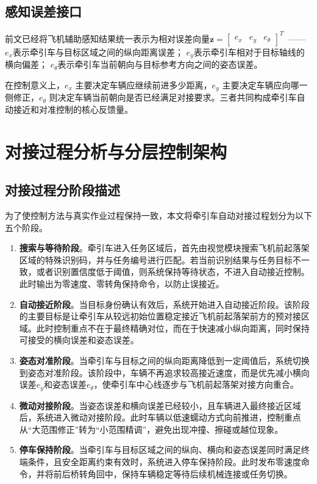 \subsection{感知误差接口}

前文已经将飞机辅助感知结果统一表示为相对误差向量\(\mathbf{z} = \begin{bmatrix}
e_{x} & e_{y} & e_{\theta}
\end{bmatrix}^{T}\)
\(\ \)------\(e_{x}\)表示牵引车与目标区域之间的纵向距离误差；
\(e_{y}\)表示牵引车相对于目标轴线的横向偏差；
\(e_{\theta}\)表示牵引车当前朝向与目标参考方向之间的姿态误差。

在控制意义上，\(e_{x}\) 主要决定车辆应继续前进多少距离，\(e_{y}\)
主要决定车辆应向哪一侧修正，\(e_{\theta}\)
则决定车辆当前朝向是否已经满足对接要求。三者共同构成牵引车自动接近和对准控制的核心反馈量。

\section{对接过程分析与分层控制架构}

\subsection{对接过程分阶段描述}

为了使控制方法与真实作业过程保持一致，本文将牵引车自动对接过程划分为以下五个阶段。
\begin{enumerate}[label=（\arabic*）,leftmargin=4em]
\item \textbf{搜索与等待阶段}。牵引车进入任务区域后，首先由视觉模块搜索飞机前起落架区域的特殊识别码，并与任务编号进行匹配。若当前识别结果与任务目标不一致，或者识别置信度低于阈值，则系统保持等待状态，不进入自动接近控制。此时输出为零速度、零转角保持命令，以防止误接近。
\item \textbf{自动接近阶段}。当目标身份确认有效后，系统开始进入自动接近阶段。该阶段的主要目标是让牵引车从较远初始位置稳定接近飞机前起落架前方的预对接区域。此时控制重点不在于最终精确对位，而在于快速减小纵向距离，同时保持可接受的横向误差和姿态误差。
\item \textbf{姿态对准阶段}。当牵引车与目标之间的纵向距离降低到一定阈值后，系统切换到姿态对准阶段。该阶段中，车辆不再追求较高接近速度，而是优先减小横向误差\(e_y\)和姿态误差\(e_\theta\)，使牵引车中心线逐步与飞机前起落架对接方向重合。
\item \textbf{微动对接阶段}。当姿态误差和横向误差已经较小，且车辆进入最终接近区域后，系统进入微动对接阶段。此时车辆以低速蠕动方式向前推进，控制重点从``大范围修正''转为``小范围精调''，避免出现冲撞、擦碰或越位现象。
\item \textbf{停车保持阶段}。当牵引车与目标区域之间的纵向、横向和姿态误差同时满足终端条件，且安全距离约束有效时，系统进入停车保持阶段。此时发布零速度命令，并将前后桥转角回中，保持车辆稳定等待后续机械连接或任务切换。
\end{enumerate}

